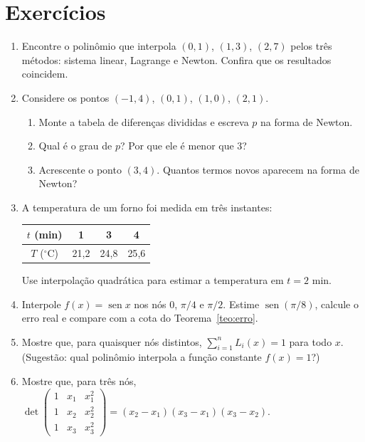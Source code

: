 \section{Exercícios}

\begin{enumerate}[label=\textbf{\arabic*.},leftmargin=*]
\item Encontre o polinômio que interpola $(0,1)$, $(1,3)$, $(2,7)$ pelos três métodos:
  sistema linear, Lagrange e Newton. Confira que os resultados coincidem.

\item Considere os pontos $(-1,4)$, $(0,1)$, $(1,0)$, $(2,1)$.
  \begin{enumerate}[label=(\alph*),nosep]
  \item Monte a tabela de diferenças divididas e escreva $p$ na forma de Newton.
  \item Qual é o grau de $p$? Por que ele é menor que 3?
  \item Acrescente o ponto $(3,4)$. Quantos termos novos aparecem na forma de Newton?
  \end{enumerate}

\item A temperatura de um forno foi medida em três instantes:
  \begin{center}
  \begin{tabular}{c|ccc}
  $t$ (min) & 1 & 3 & 4\\ \hline
  $T$ ($^\circ$C) & 21{,}2 & 24{,}8 & 25{,}6
  \end{tabular}
  \end{center}
  Use interpolação quadrática para estimar a temperatura em $t=2$ min.

\item Interpole $f(x)=\operatorname{sen}x$ nos nós $0$, $\pi/4$ e $\pi/2$. Estime
  $\operatorname{sen}(\pi/8)$, calcule o erro real e compare com a cota do
  Teorema~\ref{teo:erro}.

\item Mostre que, para quaisquer nós distintos, $\displaystyle\sum_{i=1}^{n}L_i(x)=1$ para
  todo $x$. (Sugestão: qual polinômio interpola a função constante $f(x)=1$?)

\item\label{ex:vandermonde} Mostre que, para três nós,
  $\det\begin{pmatrix}1&x_1&x_1^2\\1&x_2&x_2^2\\1&x_3&x_3^2\end{pmatrix}
  =(x_2-x_1)(x_3-x_1)(x_3-x_2)$.


\end{enumerate}
